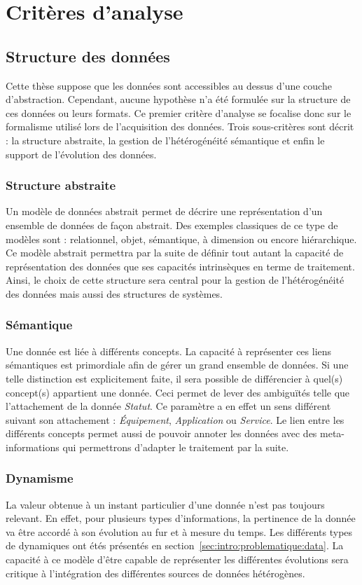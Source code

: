\section{Critères d'analyse}\label{sec:rw:supervision:criteres}
\subsection{Structure des données}
Cette thèse suppose que les données sont accessibles au dessus d'une couche d'abstraction. Cependant, aucune hypothèse n'a été formulée sur la structure de ces données ou leurs formats. Ce premier critère d'analyse se focalise donc sur le formalisme utilisé lors de l'acquisition des données. Trois sous-critères sont décrit : la structure abstraite, la gestion de l'hétérogénéité sémantique et enfin le support de l'évolution des données.

\subsubsection{Structure abstraite}
Un modèle de données abstrait permet de décrire une représentation d'un ensemble de données de façon abstrait. Des exemples classiques de ce type de modèles sont : relationnel, objet, sémantique, à dimension ou encore hiérarchique. Ce modèle abstrait permettra par la suite de définir tout autant la capacité de représentation des données que ses capacités intrinsèques en terme de traitement. Ainsi, le choix de cette structure sera central pour la gestion de l'hétérogénéité des données mais aussi des structures de systèmes.
\subsubsection{Sémantique}
Une donnée est liée à différents concepts. La capacité à représenter ces liens sémantiques est primordiale afin de gérer un grand ensemble de données. Si une telle distinction est explicitement faite, il sera possible de différencier à quel(s) concept(s) appartient une donnée. Ceci permet de lever des ambiguïtés telle que l'attachement de la donnée \textit{Statut}. Ce paramètre a en effet un sens différent suivant son attachement : \textit{Équipement}, \textit{Application} ou \textit{Service}. Le lien entre les différents concepts permet aussi de pouvoir annoter les données avec des meta-informations qui permettrons d'adapter le traitement par la suite.
\subsubsection{Dynamisme}
La valeur obtenue à un instant particulier d'une donnée n'est pas toujours relevant. En effet, pour plusieurs types d'informations, la pertinence de la donnée va être accordé à son évolution au fur et à mesure du temps. Les différents types de dynamiques ont étés présentés en section~\ref{sec:intro:problematique:data}. La capacité à ce modèle d'être capable de représenter les différentes évolutions sera critique à l'intégration des différentes sources de données hétérogènes.

